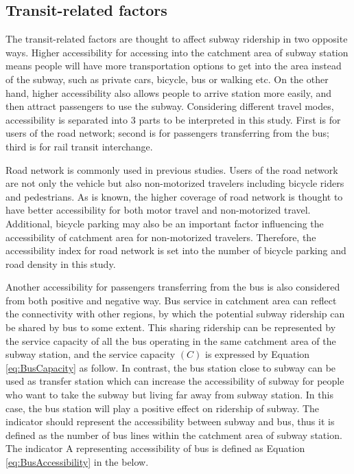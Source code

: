\documentclass[utf8]{article}
\begin{document}
\subsection{Transit-related factors}
\indent

The transit-related factors are thought to affect subway ridership in two opposite ways. Higher accessibility for accessing into the catchment area of subway station means people will have more transportation options to get into the area instead of the subway, such as private cars, bicycle, bus or walking etc. On the other hand, higher accessibility also allows people to arrive station more easily, and then attract passengers to use the subway. Considering different travel modes, accessibility is separated into 3 parts to be interpreted in this study. First is for users of the road network; second is for passengers transferring from the bus; third is for rail transit interchange.

%
Road network is commonly used in previous studies. Users of the road network are not only the vehicle but also non-motorized travelers including bicycle riders and pedestrians. As is known, the higher coverage of road network is thought to have better accessibility for both motor travel and non-motorized travel. Additional, bicycle parking may also be an important factor influencing the accessibility of catchment area for non-motorized travelers. Therefore, the accessibility index for road network is set into the number of bicycle parking and road density in this study.

%
Another accessibility for passengers transferring from the bus is also considered from both positive and negative way. Bus service in catchment area can reflect the connectivity with other regions, by which the potential subway ridership can be shared by bus to some extent. This sharing ridership can be represented by the service capacity of all the bus operating in the same catchment area of the subway station, and the service capacity $(C)$ is expressed by Equation \ref{eq:BusCapacity} as follow. In contrast, the bus station close to subway can be used as transfer station which can increase the accessibility of subway for people who want to take the subway but living far away from subway station. In this case, the bus station will play a positive effect on ridership of subway. The indicator should represent the accessibility between subway and bus, thus it is defined as the number of bus lines within the catchment area of subway station. The indicator A representing accessibility of bus is defined as Equation \ref{eq:BusAccessibility} in the below.
\end{document}
